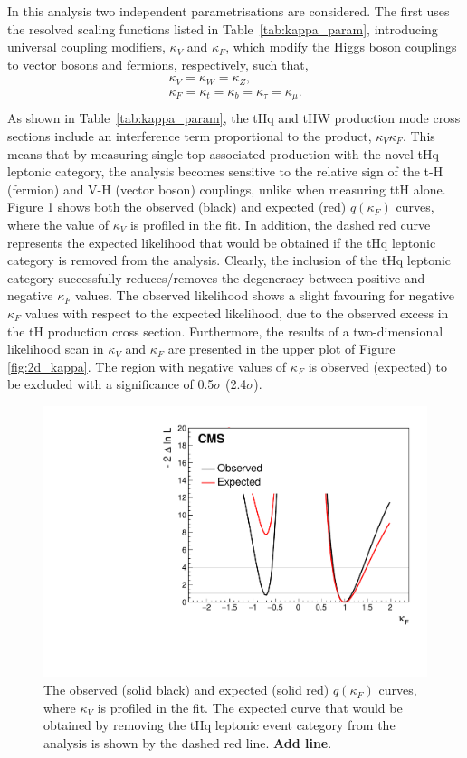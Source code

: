 In this analysis two independent parametrisations are considered. The first uses the resolved scaling functions listed in Table~\ref{tab:kappa_param}, introducing universal coupling modifiers, $\kappa_V$ and $\kappa_F$, which modify the Higgs boson couplings to vector bosons and fermions, respectively, such that,
\begin{equation}
    \begin{split}
        \kappa_V = \kappa_W = \kappa_Z, \\
        \kappa_F = \kappa_t = \kappa_b = \kappa_\tau = \kappa_\mu. \\
    \end{split}
\end{equation}
\noindent
As shown in Table~\ref{tab:kappa_param}, the tHq and tHW production mode cross sections include an interference term proportional to the product, $\kappa_V\kappa_F$. This means that by measuring single-top associated production with the novel tHq leptonic category, the analysis becomes sensitive to the relative sign of the t-H (fermion) and V-H (vector boson) couplings, unlike when measuring ttH alone. Figure \ref{fig:kappa_F} shows both the observed (black) and expected (red) $q(\kappa_F)$ curves, where the value of $\kappa_V$ is profiled in the fit. In addition, the dashed red curve represents the expected likelihood that would be obtained if the tHq leptonic category is removed from the analysis. Clearly, the inclusion of the tHq leptonic category successfully reduces/removes the degeneracy between positive and negative $\kappa_F$ values. The observed likelihood shows a slight favouring for negative $\kappa_F$ values with respect to the expected likelihood, due to the observed excess in the tH production cross section. Furthermore, the results of a two-dimensional likelihood scan in $\kappa_V$ and $\kappa_F$ are presented in the upper plot of Figure \ref{fig:2d_kappa}. The region with negative values of $\kappa_F$ is observed (expected) to be excluded with a significance of 0.5$\sigma$ (2.4$\sigma$).

\begin{figure}[htb]
  \centering
  \includegraphics[width=.6\textwidth]{Figures/hgg_results/profile1D_kappa_F.pdf}
  \caption[Observed and expected likelihood curves for $\kappa_F$]
  {
    The observed (solid black) and expected (solid red) $q(\kappa_F)$ curves, where $\kappa_V$ is profiled in the fit. The expected curve that would be obtained by removing the tHq leptonic event category from the analysis is shown by the dashed red line. \textbf{Add line}.
  }
  \label{fig:kappa_F}
\end{figure}


